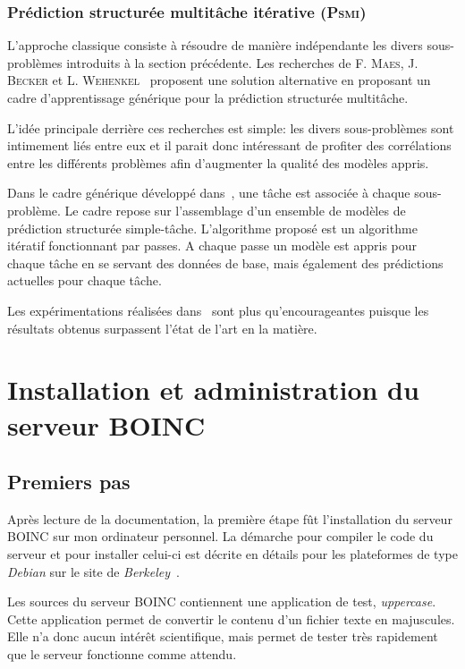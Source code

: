 \documentclass[a4paper, 12pt]{report}
\begin{document}
\subsection{Prédiction structurée multitâche itérative (\textsc{Psmi})}
\label{psmi}
L'approche classique consiste à résoudre de manière indépendante les divers sous-problèmes introduits à la section précédente. Les recherches de F. \textsc{Maes}, J. \textsc{Becker} et L. \textsc{Wehenkel}~\cite{CAP} proposent une solution alternative en proposant un cadre d'apprentissage générique pour la prédiction structurée multitâche. 

L'idée principale derrière ces recherches est simple: les divers sous-problèmes sont intimement liés entre eux et il parait donc intéressant de profiter des corrélations entre les différents problèmes afin d'augmenter la qualité des modèles appris. 

Dans le cadre générique développé dans~\cite{CAP}, une tâche est associée à chaque sous-problème. Le cadre repose sur l'assemblage d'un ensemble de modèles de prédiction structurée simple-tâche. L'algorithme proposé est un algorithme itératif fonctionnant par passes. A chaque passe un modèle est appris pour chaque tâche en se servant des données de base, mais également des prédictions actuelles pour chaque tâche.

Les expérimentations réalisées dans~\cite{CAP} sont plus qu'encourageantes puisque les résultats obtenus surpassent l'état de l'art en la matière.

\chapter{Installation et administration du serveur \textsc{BOINC}}
\minitoc
\label{chapboincinstall}
\section{Premiers pas}
Après lecture de la documentation, la première étape fût l'installation du serveur \textsc{BOINC} sur mon ordinateur personnel. La démarche pour compiler le code du serveur et pour installer celui-ci est décrite en détails pour les plateformes de type \textit{Debian} sur le site de \textit{Berkeley}~\cite{BOINC}.

Les sources du serveur \textsc{BOINC} contiennent une application de test, \textit{uppercase}. Cette application permet de convertir le contenu d'un fichier texte en majuscules. Elle n'a donc aucun intérêt scientifique, mais permet de tester très rapidement que le serveur fonctionne comme attendu.
\end{document}
